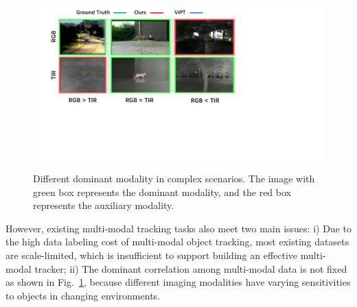 \documentclass[letterpaper]{article} %
\begin{document}
\begin{figure}[t]
\centering
\includegraphics[width=1\columnwidth]{Figures/Figure1.pdf}
\caption{Different dominant modality in complex scenarios. The image with green box represents the dominant modality, and the red box represents the auxiliary modality.
}
\label{fig:dynamic}
\end{figure}



However, existing multi-modal tracking tasks also meet two main issues: i)
Due to the high data labeling cost of multi-modal object tracking, most existing datasets are scale-limited, which is insufficient to support building an effective multi-modal tracker;
ii) The dominant correlation among multi-modal data is not fixed as shown in Fig.~\ref{fig:dynamic}, because different imaging modalities have varying sensitivities to objects in changing environments.
\end{document}

